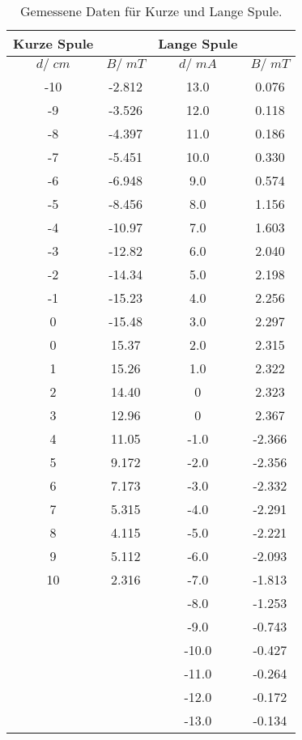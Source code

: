 \begin{table}[H]
  \centering
   \begin{tabular}{c c| c c}
    \hline
    \;\;\;\;   Kurze Spule & &\;\;\;\;    Lange Spule&  \\
    \toprule
    $d /\;\si{cm}$& $B/\;\si{mT}$ & $d /\;\si{mA}$ & $ B/\;\si{mT}$ \\
    \midrule
    -10 & -2.812 & 13.0 & 0.076\\
    -9 & -3.526 & 12.0 & 0.118\\
    -8 & -4.397 & 11.0 & 0.186\\
    -7 & -5.451 & 10.0 & 0.330\\
    -6 & -6.948 & 9.0 & 0.574\\
    -5 & -8.456 & 8.0 & 1.156\\
    -4 & -10.97 & 7.0 & 1.603\\
    -3 & -12.82 & 6.0 & 2.040\\
    -2 & -14.34 & 5.0 & 2.198\\
    -1 & -15.23 & 4.0 & 2.256\\
    0 & -15.48 & 3.0 & 2.297\\
    0 & 15.37 & 2.0 & 2.315\\
    1 & 15.26 & 1.0 & 2.322\\
    2 & 14.40 & 0 & 2.323\\
    3 & 12.96 & 0 & 2.367\\
    4 & 11.05 & -1.0 & -2.366\\
    5 & 9.172 & -2.0 & -2.356\\
    6 & 7.173 & -3.0 & -2.332\\
    7 & 5.315 & -4.0 & -2.291\\
    8 & 4.115 & -5.0 & -2.221\\
    9 & 5.112 & -6.0 & -2.093\\
    10 & 2.316 & -7.0 & -1.813\\
             & &-8.0 & -1.253\\
             & &-9.0 & -0.743\\
             & &-10.0& -0.427\\
             & &-11.0 &-0.264\\
             & &-12.0 &-0.172\\
             & &-13.0 &-0.134\\
    \bottomrule
  \end{tabular}
  \caption{Gemessene Daten für Kurze und Lange Spule.}
  \label{tab:tabelle2}
\end{table}
